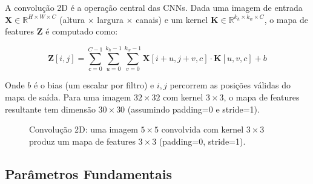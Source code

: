A convolução 2D é a operação central das CNNs. Dada uma imagem de entrada
$\mathbf{X} \in \mathbb{R}^{H \times W \times C}$ (altura $\times$ largura
$\times$ canais) e um kernel $\mathbf{K} \in \mathbb{R}^{k_h \times k_w \times C}$,
o mapa de features $\mathbf{Z}$ é computado como:

\begin{equation}
  \mathbf{Z}[i, j] = \sum_{c=0}^{C-1} \sum_{u=0}^{k_h-1} \sum_{v=0}^{k_w-1}
    \mathbf{X}[i+u, j+v, c] \cdot \mathbf{K}[u, v, c] + b
  \label{eq:conv2d}
\end{equation}

Onde $b$ é o bias (um escalar por filtro) e $i, j$ percorrem as posições válidas
do mapa de saída. Para uma imagem $32 \times 32$ com kernel $3 \times 3$, o mapa
de features resultante tem dimensão $30 \times 30$ (assumindo padding=0 e stride=1).

\begin{figure}[H]
  \centering
  \caption{Convolução 2D: uma imagem $5 \times 5$ convolvida com kernel $3 \times 3$
  produz um mapa de features $3 \times 3$ (padding=0, stride=1).}
  \label{fig:conv-2d-demo}
\end{figure}

\subsection{Parâmetros Fundamentais}

